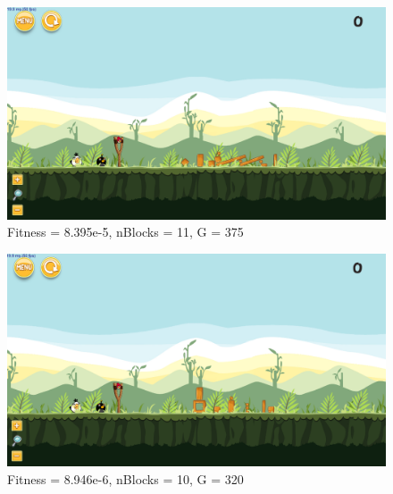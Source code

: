 \begin{figure}[H]
	\centering
	\includegraphics[scale=0.35]{gfx/e4/level-0-second_crossover_min10_180606_233100.png}
	\caption{Fitness = 8.395e-5, nBlocks = 11, G = 375 }\label{f:e4-3}
\end{figure}

\begin{figure}[H]
	\centering
	\includegraphics[scale=0.35]{gfx/e4/level-0-second_crossover_min10_verbose180614_181948.png}
	\caption{Fitness = 8.946e-6, nBlocks = 10, G = 320  }\label{f:e4-4}
\end{figure}


